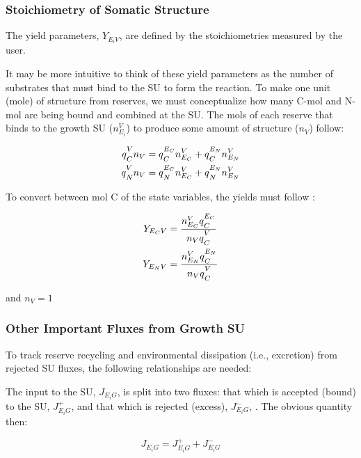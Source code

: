 \documentclass[
]{article}
\begin{document}
\subsubsection{Stoichiometry of Somatic
Structure}\label{stoichiometry-of-somatic-structure}

The yield parameters, \(Y_{{E_i}V}\), are defined by the stoichiometries
measured by the user.

It may be more intuitive to think of these yield parameters as the
number of substrates that must bind to the SU to form the reaction. To
make one unit (mole) of structure from reserves, we must conceptualize
how many C-mol and N-mol are being bound and combined at the SU. The
mols of each reserve that binds to the growth SU (\(n_{E_i}^{V}\)) to
produce some amount of structure (\(n_V\)) follow:

\begin{align}
{q\strut_{C}^{V}}{n_V} &= {q\strut_{C}^{E_C}}{n_{E_C}^{V}} + {q\strut_{C}^{E_N}}{n_{E_N}^{V}}
\\
{q\strut_{N}^{V}}{n_V} &= {q\strut_{N}^{E_C}}{n_{E_C}^{V}} + {q\strut_{N}^{E_N}}{n_{E_N}^{V}}
\end{align}

To convert between mol C of the state variables, the yields must follow
:

\begin{align}
Y_{{E_C}V} &= \frac{{n_{E_C}^{V}}{q\strut_{C}^{E_C}}}{{n_V}{q\strut_{C}^{V}}}
\\
Y_{{E_N}V} &= \frac{{n_{E_N}^{V}}{q\strut_{C}^{E_N}}}{{n_V}{q\strut_{C}^{V}}}
\end{align}

and \(n_V = 1\)

\subsubsection{Other Important Fluxes from Growth
SU}\label{other-important-fluxes-from-growth-su}

To track reserve recycling and environmental dissipation (i.e.,
excretion) from rejected SU fluxes, the following relationships are
needed:

The input to the SU, \(J_{E_{i}G}\), is split into two fluxes: that
which is accepted (bound) to the SU, \(J_{E_{i}G}^{+}\), and that which
is rejected (excess), \(J_{E_{i}G}^{-}\), . The obvious quantity then:

\begin{equation}
J_{E_{i}G} = J_{E_{i}G}^{+} + J_{E_{i}G}^{-}
\end{equation}
\end{document}
